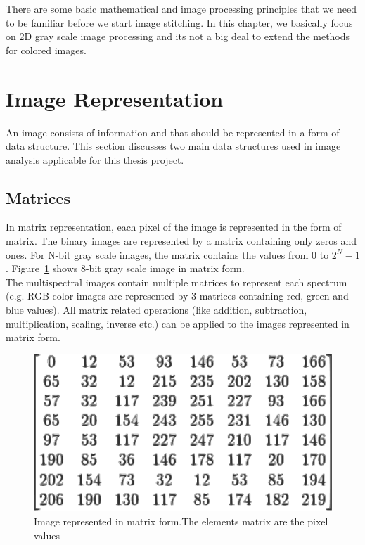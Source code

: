 There are some basic mathematical and image processing principles that we need to be familiar before we start image stitching. In this chapter, we basically focus on 2D gray scale image processing and its not a big deal to extend the methods for colored images. 
\section{Image Representation}
An image consists of information and that should be represented in a form of data structure. This section discusses two main data structures used in image analysis applicable for this thesis project.
\subsection{Matrices}
In matrix representation, each pixel of the image is represented in the form of matrix. The binary images are represented by a matrix containing only zeros and ones. For N-bit gray scale images, the matrix contains the values from 0 to $2^N-1$. Figure~\ref{fig:image_matrix} shows 8-bit gray scale image in matrix form.\\

\noindent The multispectral images contain multiple matrices to represent each spectrum (e.g. RGB color images are represented by 3 matrices containing red, green and blue values). All matrix related operations (like addition, subtraction, multiplication, scaling, inverse etc.) can be applied to the images represented in matrix form. 
\begin{figure}[t]%
\begin{center}
\includegraphics[width=0.6\columnwidth]{2.mainmatter/1.Introduction/figures/matrix_image}%
\caption[Image in Matrix Form]{Image represented in matrix form.The elements matrix are the pixel values}%
\label{fig:image_matrix}%
\end{center}
\end{figure}

